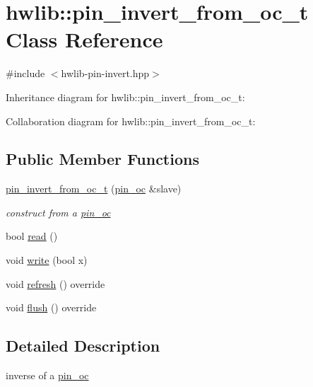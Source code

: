 \hypertarget{classhwlib_1_1pin__invert__from__oc__t}{}\section{hwlib\+:\+:pin\+\_\+invert\+\_\+from\+\_\+oc\+\_\+t Class Reference}
\label{classhwlib_1_1pin__invert__from__oc__t}


{\ttfamily \#include $<$hwlib-\/pin-\/invert.\+hpp$>$}



Inheritance diagram for hwlib\+:\+:pin\+\_\+invert\+\_\+from\+\_\+oc\+\_\+t\+:


Collaboration diagram for hwlib\+:\+:pin\+\_\+invert\+\_\+from\+\_\+oc\+\_\+t\+:
\subsection*{Public Member Functions}
\begin{DoxyCompactItemize}
\item 
\mbox{\label{classhwlib_1_1pin__invert__from__oc__t_a11056a043e9072a8d9b821de79aa0085}} 
\hyperlink{classhwlib_1_1pin__invert__from__oc__t_a11056a043e9072a8d9b821de79aa0085}{pin\+\_\+invert\+\_\+from\+\_\+oc\+\_\+t} (\hyperlink{classhwlib_1_1pin__oc}{pin\+\_\+oc} \&slave)
\begin{DoxyCompactList}\small\item\em construct from a \hyperlink{classhwlib_1_1pin__oc}{pin\+\_\+oc} \end{DoxyCompactList}\item 
bool \hyperlink{classhwlib_1_1pin__invert__from__oc__t_a650ed38934b4585f42c756edd19b9c67}{read} ()
\item 
void \hyperlink{classhwlib_1_1pin__invert__from__oc__t_a60831a081f8f796a47e41a87bef8a398}{write} (bool x)
\item 
void \hyperlink{classhwlib_1_1pin__invert__from__oc__t_ab2394ce2e52a3dd16a22663436d000f7}{refresh} () override
\item 
void \hyperlink{classhwlib_1_1pin__invert__from__oc__t_ad470fa699bc65083d65190ff22efe600}{flush} () override
\end{DoxyCompactItemize}


\subsection{Detailed Description}
inverse of a \hyperlink{classhwlib_1_1pin__oc}{pin\+\_\+oc}

